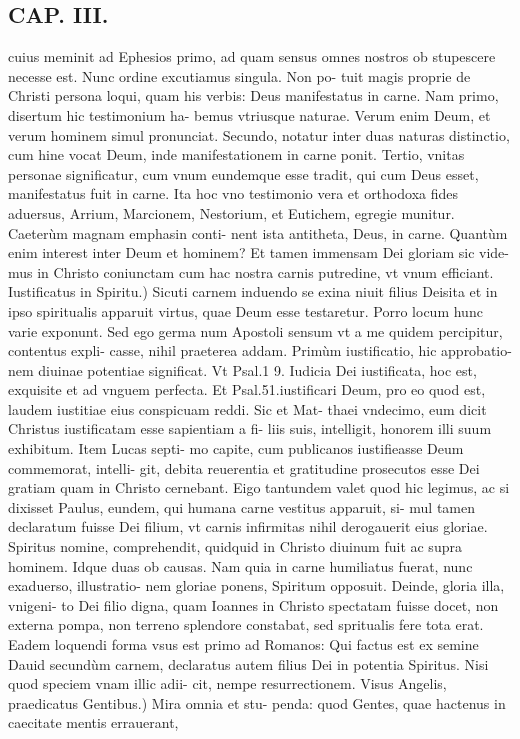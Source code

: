 \documentclass{article}
\begin{document}
\begin{pages}
\section*{CAP. III. }
\marginpar{[ p.40 ]}\pstart cuius meminit ad Ephesios primo, ad quam sensus omnes nostros ob stupescere necesse est. Nunc ordine excutiamus singula. Non po- tuit magis proprie de Christi persona loqui, quam his verbis: Deus manifestatus in carne. Nam primo, disertum hic testimonium ha- bemus vtriusque naturae. Verum enim Deum, et verum hominem simul pronunciat. Secundo, notatur inter duas naturas distinctio, cum hine vocat Deum, inde manifestationem in carne ponit. Tertio, vnitas personae significatur, cum vnum eundemque esse tradit, qui cum Deus esset, manifestatus fuit in carne. Ita hoc vno testimonio vera et orthodoxa fides aduersus, Arrium, Marcionem, Nestorium, et Eutichem, egregie munitur. Caeterùm magnam emphasin conti- nent ista antitheta, Deus, in carne. Quantùm enim interest inter Deum et hominem? Et tamen immensam Dei gloriam sic vide- mus in Christo coniunctam cum hac nostra carnis putredine, vt vnum efficiant.  \pend\pstart Iustificatus in Spiritu.) Sicuti carnem induendo se exina niuit filius Deisita et in ipso spiritualis apparuit virtus, quae Deum esse testaretur. Porro locum hunc varie exponunt. Sed ego germa num Apostoli sensum vt a me quidem percipitur, contentus expli- casse, nihil praeterea addam. Primùm iustificatio, hic approbatio- nem diuinae potentiae significat. Vt Psal.1 9. Iudicia Dei iustificata, hoc est, exquisite et ad vnguem perfecta. Et Psal.51.iustificari Deum, pro eo quod est, laudem iustitiae eius conspicuam reddi. Sic et Mat- thaei vndecimo, eum dicit Christus iustificatam esse sapientiam a fi- liis suis, intelligit, honorem illi suum exhibitum. Item Lucas septi- mo capite, cum publicanos iustifieasse Deum commemorat, intelli- git, debita reuerentia et gratitudine prosecutos esse Dei gratiam quam in Christo cernebant. Eigo tantundem valet quod hic legimus, ac si dixisset Paulus, eundem, qui humana carne vestitus apparuit, si- mul tamen declaratum fuisse Dei filium, vt carnis infirmitas nihil derogauerit eius gloriae. Spiritus nomine, comprehendit, quidquid in Christo diuinum fuit ac supra hominem. Idque duas ob causas. Nam quia in carne humiliatus fuerat, nunc exaduerso, illustratio- nem gloriae ponens, Spiritum opposuit. Deinde, gloria illa, vnigeni- to Dei filio digna, quam Ioannes in Christo spectatam fuisse docet, non externa pompa, non terreno splendore constabat, sed spritualis fere tota erat. Eadem loquendi forma vsus est primo ad Romanos: Qui factus est ex semine Dauid secundùm carnem, declaratus autem filius Dei in potentia Spiritus. Nisi quod speciem vnam illic adii- cit, nempe resurrectionem.  \pend\pstart Visus Angelis, praedicatus Gentibus.) Mira omnia et stu- penda: quod Gentes, quae hactenus in caecitate mentis errauerant,  \pend

\end{pages}
\end{document}
